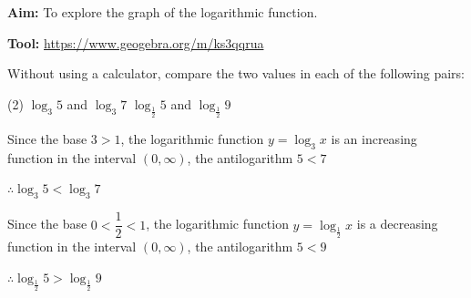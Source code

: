 \documentclass{report}
\begin{document}
        \begin{explore}
            
            \textbf{Aim:} To explore the graph of the logarithmic function.
            
            \textbf{Tool:} \url{https://www.geogebra.org/m/ks3qqrua}
        \end{explore}

        \begin{question}
            Without using a calculator, compare the two values in each of the following pairs:
            \begin{tasks}[label=(\alph*)](2)
                \task $\log _3 5$ and $\log _3 7$
                \task $\log _{\frac{1}{2}} 5$ and $\log _{\frac{1}{2}} 9$
            \end{tasks}

            \sol{}
            \begin{tasks}[label=(\alph*)]
                \task Since the base $3 > 1$, the logarithmic function $y=\log_3 x$ is an increasing function in the interval $(0, \infty)$, the antilogarithm $5<7$

                $\therefore \log _3 5<\log _3 7$

                \task Since the base $0<\dfrac{1}{2}<1$, the logarithmic function $y=\log_{\frac{1}{2}} x$ is a decreasing function in the interval $(0, \infty)$, the antilogarithm $5<9$

                $\therefore \log _{\frac{1}{2}} 5>\log _{\frac{1}{2}} 9$
            \end{tasks}
        \end{question}
\end{document}
